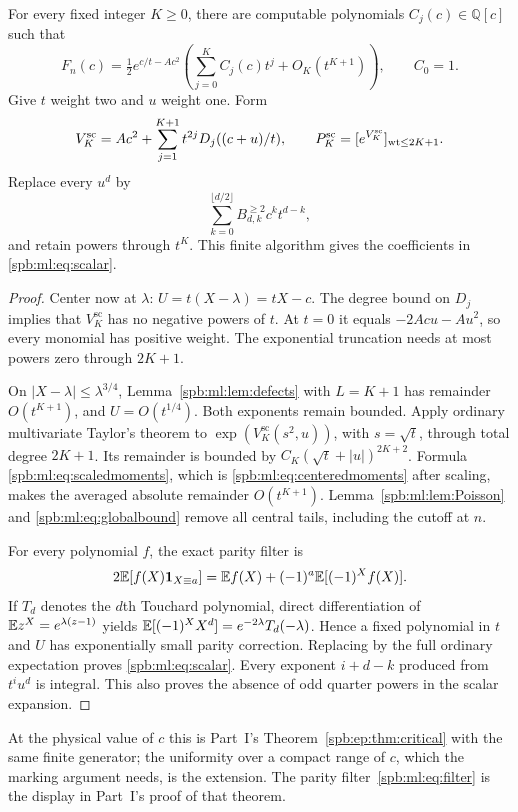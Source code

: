 \begin{proposition}\label{spb:ml:prop:scalar}
For every fixed integer $K\ge0$, there are computable polynomials $C_j(c)\in\mathbb Q[c]$ such that
\begin{equation}\label{spb:ml:eq:scalar}
 F_n(c)=\tfrac12 e^{c/t-Ac^2}
 \left(\sum_{j=0}^K C_j(c)t^j+O_K(t^{K+1})\right),\qquad C_0=1.
\end{equation}
Give $t$ weight two and $u$ weight one. Form
\[
 V_K^{\mathrm{sc}}=Ac^2+\sum_{j=1}^{K+1}t^{2j}D_j((c+u)/t),
 \qquad P_K^{\mathrm{sc}}=[e^{V_K^{\mathrm{sc}}}]_{\operatorname{wt}\le2K+1}.
\]
Replace every $u^d$ by
\begin{equation}\label{spb:ml:eq:scaledmoments}
 \sum_{k=0}^{\lfloor d/2\rfloor}B_{d,k}^{\ge2}c^kt^{d-k},
\end{equation}
and retain powers through $t^K$. This finite algorithm gives the coefficients in \eqref{spb:ml:eq:scalar}.
\end{proposition}
\begin{proof}
Center now at $\lambda$: $U=t(X-\lambda)=tX-c$. The degree bound on $D_j$ implies that $V_K^{\mathrm{sc}}$ has no negative powers of $t$. At $t=0$ it equals $-2Acu-Au^2$, so every monomial has positive weight. The exponential truncation needs at most powers zero through $2K+1$.

On $|X-\lambda|\le\lambda^{3/4}$, Lemma~\ref{spb:ml:lem:defects} with $L=K+1$ has remainder $O(t^{K+1})$, and $U=O(t^{1/4})$. Both exponents remain bounded. Apply ordinary multivariate Taylor's theorem to $\exp(V_K^{\mathrm{sc}}(s^2,u))$, with $s=\sqrt t$, through total degree $2K+1$. Its remainder is bounded by $C_K(\sqrt t+|u|)^{2K+2}$. Formula \eqref{spb:ml:eq:scaledmoments}, which is \eqref{spb:ml:eq:centeredmoments} after scaling, makes the averaged absolute remainder $O(t^{K+1})$. Lemma~\ref{spb:ml:lem:Poisson} and \eqref{spb:ml:eq:globalbound} remove all central tails, including the cutoff at $n$.

For every polynomial $f$, the exact parity filter is
\begin{equation}\label{spb:ml:eq:filter}
 2\mathbb E[f(X)\mathbf 1_{X\equiv a}]=\mathbb E f(X)+(-1)^a\mathbb E[(-1)^Xf(X)].
\end{equation}
If $T_d$ denotes the $d$th Touchard polynomial, direct differentiation of $\mathbb E z^X=e^{\lambda(z-1)}$ yields
$\mathbb E[(-1)^XX^d]=e^{-2\lambda}T_d(-\lambda)$. Hence a fixed polynomial in $t$ and $U$ has exponentially small parity correction. Replacing by the full ordinary expectation proves \eqref{spb:ml:eq:scalar}. Every exponent $i+d-k$ produced from $t^iu^d$ is integral. This also proves the absence of odd quarter powers in the scalar expansion.
\end{proof}
\begin{writenote}[7 October 2026]
At the physical value of $c$ this is Part~I's
Theorem~\ref{spb:ep:thm:critical} with the same finite generator; the
uniformity over a compact range of $c$, which the marking argument needs, is
the extension. The parity filter~\eqref{spb:ml:eq:filter} is the display in
Part~I's proof of that theorem.
\end{writenote}


